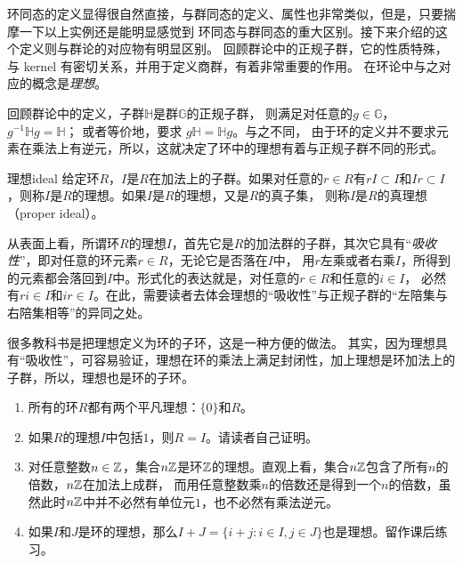 环同态的定义显得很自然直接，与群同态的定义、属性也非常类似，但是，只要揣摩一下以上实例还是能明显感觉到
环同态与群同态的重大区别。接下来介绍的这个定义则与群论的对应物有明显区别。
回顾群论中的正规子群，它的性质特殊，与 kernel 有密切关系，并用于定义商群，有着非常重要的作用。
在环论中与之对应的概念是\emph{理想}。

回顾群论中的定义，子群$\mathbb{H}$是群$\mathbb{G}$的正规子群，
则满足对任意的$g \in \mathbb{G}$，
$g^{-1} \mathbb{H} g = \mathbb{H}$；
或者等价地，要求
$g \mathbb{H}  = \mathbb{H} g$。与之不同，
由于环的定义并不要求元素在乘法上有逆元，所以，这就决定了环中的理想有着与正规子群不同的形式。

\begin{definition}{理想}{ideal}
给定环$R$，$I$是$R$在加法上的子群。如果对任意的$r \in R$有$rI \subset I$和$Ir \subset I$，则称$I$是$R$的理想。如果$I$是$R$的理想，又是$R$的真子集，
则称$I$是$R$的真理想（proper ideal）。
\end{definition}
从表面上看，所谓环$R$的理想$I$，首先它是$R$的加法群的子群，其次它具有“\emph{吸收性}”，即对任意的环元素$r\in R$，无论它是否落在$I$中，
用$r$左乘或者右乘$I$，所得到的元素都会落回到$I$中。形式化的表达就是，对任意的$r\in R$和任意的$i \in I$，
必然有$ri\in I$和$ir \in I$。在此，需要读者去体会理想的“吸收性”与正规子群的“左陪集与右陪集相等”的异同之处。

\begin{remark}
\label{rem:ideal}
很多教科书是把理想定义为环的子环，这是一种方便的做法。
其实，因为理想具有“吸收性”，可容易验证，理想在环的乘法上满足封闭性，加上理想是环加法上的子群，所以，理想也是环的子环。
\end{remark}

\begin{example}
\label{exm:ideal1}
\begin{enumerate}
\item 所有的环$R$都有两个平凡理想：$\{0\}$和$R$。

\item 如果$R$的理想$I$中包括$1$，则$R=I$。请读者自己证明。

\item 对任意整数$n\in {\mathbb Z}$，集合$n{\mathbb Z}$是环${\mathbb Z}$的理想。直观上看，集合$n{\mathbb Z}$包含了所有$n$的倍数，$n{\mathbb Z}$在加法上成群，
而用任意整数乘$n$的倍数还是得到一个$n$的倍数，虽然此时$n{\mathbb Z}$中并不必然有单位元$1$，也不必然有乘法逆元。

\item 如果$I$和$J$是环的理想，那么$I + J = \{i + j : i \in I, j \in J\}$也是理想。留作课后练习。
\end{enumerate}
\end{example}

